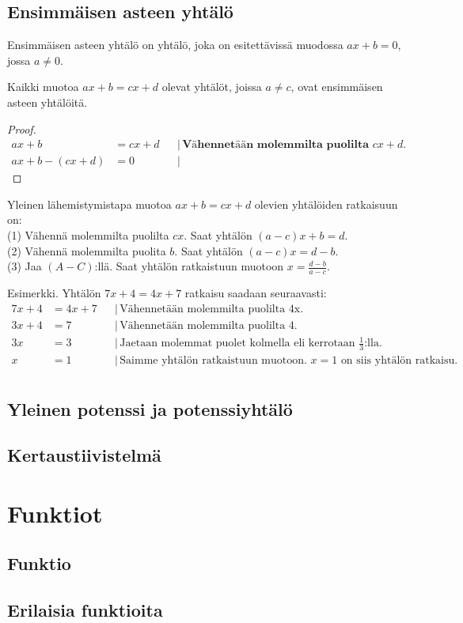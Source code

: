 \chapter{Ensimmäisen asteen yhtälö}
Ensimmäisen asteen yhtälö on yhtälö, joka on esitettävissä muodossa $ax+b=0$, jossa $a \neq 0$.

\begin{theorem}
Kaikki muotoa $ax+b=cx+d$ olevat yhtälöt, joissa $a \neq c$, ovat ensimmäisen asteen yhtälöitä.
\end{theorem}

\begin{proof}
\begin{align*}
ax+b &= cx+d & &| \, \textbf{Vähennetään molemmilta puolilta $cx+d$.} \\
ax+b - (cx+d) &= 0 & &|
\end{align*}
\end{proof}

\begin{theorem}
Yleinen lähemistymistapa muotoa $ax+b = cx+d$ olevien yhtälöiden ratkaisuun on: \\
(1) Vähennä molemmilta puolilta $cx$. Saat yhtälön $(a-c)x + b = d$. \\
(2) Vähennä molemmilta puolita $b$. Saat yhtälön $(a-c)x = d-b$. \\
(3) Jaa $(A-C)$:llä. Saat yhtälön ratkaistuun muotoon $x = \frac{d-b}{a-c}$.
\end{theorem}

Esimerkki. Yhtälön $7x+4=4x+7$ ratkaisu saadaan seuraavasti:
\begin{align*}
7x+4 &= 4x+7 & &| \, \text{Vähennetään molemmilta puolilta 4x.} \\
3x+4 &= 7 & &| \, \text{Vähennetään molemmilta puolilta 4.} \\
3x &= 3 & &| \, \text{Jaetaan molemmat puolet kolmella eli kerrotaan $\frac{1}{3}$:lla.} \\
x &= 1 & &| \, \text{Saimme yhtälön ratkaistuun muotoon. $x=1$ on siis yhtälön ratkaisu.} \\
\end{align*}

\chapter{Yleinen potenssi ja potenssiyhtälö}
\chapter{Kertaustiivistelmä}

\part{Funktiot}
\chapter{Funktio}
\chapter{Erilaisia funktioita}